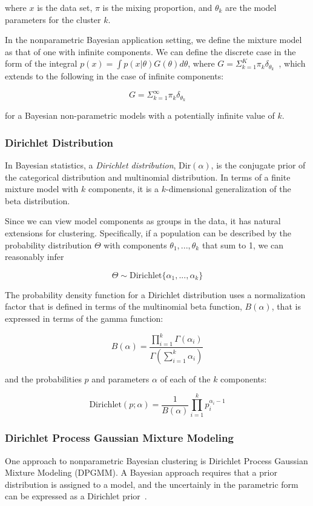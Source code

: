 where $x$ is the data set, $\pi$ is the mixing proportion, and $\theta_k$ are the model parameters for the cluster $k$.

In the nonparametric Bayesian application setting, we define the mixture model as that of one with infinite components.  We can define the discrete case in the form of the integral $p(x) = \int p(x|\theta)G(\theta)d\theta$, where $G = \Sigma_{k=1}^K \pi_k \delta_{\theta_k}$~\cite{OrbanzT10}, which extends to the following in the case of infinite components:

$$G = \Sigma_{k=1}^\infty \pi_k \delta_{\theta_k}$$

for a Bayesian non-parametric models with a potentially infinite value of $k$.

\subsubsection{Dirichlet Distribution}
In Bayesian statistics, a \emph{Dirichlet distribution}, Dir$(\alpha)$, is the conjugate prior of the categorical distribution and multinomial distribution.   In terms of a finite mixture model with $k$ components, it is a $k$-dimensional generalization of the beta distribution.

Since we can view model components as groups in the data, it has natural extensions for clustering.   Specifically, if a population can be described by the probability distribution $\Theta$ with components $\theta_{1},...,\theta_{k}$ that sum to 1, we can reasonably infer

$$\Theta \sim \text{Dirichlet}\{\alpha_{1},...,\alpha_{k}\}$$

The probability density function for a Dirichlet distribution uses a normalization factor that is defined in terms of the multinomial beta function, $B(\alpha)$,  that is expressed in terms of the gamma function:

$$B(\alpha)= \frac{\prod_{i=1}^{k} \Gamma(\alpha_{i})} {\Gamma(\sum_{i=1}^{k} \alpha_{i})}$$

\noindent and the probabilities $p$ and parameters $\alpha$ of each of the $k$ components:

$$\text{Dirichlet}(p;\alpha)=\frac{1}{B(\alpha)}\prod_{i=1}^{k} p_{i}^{\alpha_{i}-1}$$

\subsubsection{Dirichlet Process Gaussian Mixture Modeling}
One approach to nonparametric Bayesian clustering is Dirichlet Process Gaussian Mixture Modeling (DPGMM).   A Bayesian approach requires that a prior distribution is assigned to a model, and the uncertainly in the parametric form can be expressed as a Dirichlet prior~\cite{Gorur}.

